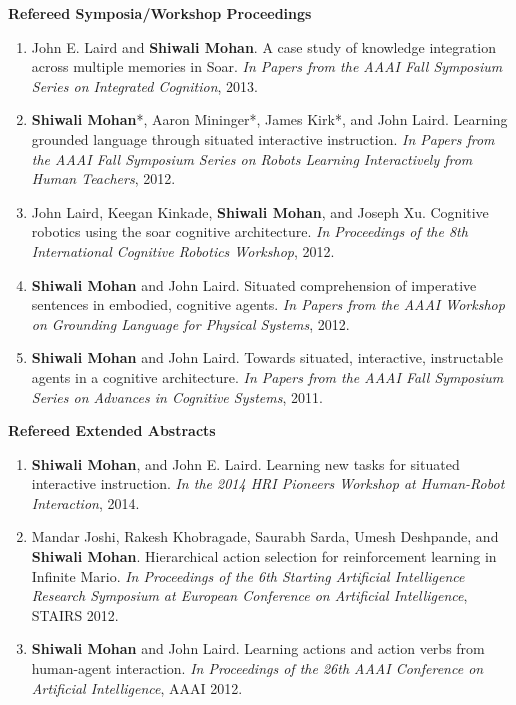 \documentclass[margin,line,11pt]{res}
\begin{document}
\begin{resume}
\textbf{Refereed Symposia/Workshop Proceedings}
\begin{enumerate}[label=\lbrack W\arabic*\rbrack:,leftmargin=*]
\item John E. Laird and \textbf{Shiwali Mohan}. A case study of knowledge integration across multiple memories in
Soar. \emph{In Papers from the AAAI Fall Symposium Series on Integrated Cognition}, 2013.
\item \textbf{Shiwali Mohan}*, Aaron Mininger*, James Kirk*, and John Laird. Learning grounded language through
situated interactive instruction. \emph{In Papers from the AAAI Fall Symposium Series on Robots Learning Interactively from Human Teachers}, 2012.
\item John Laird, Keegan Kinkade, \textbf{Shiwali Mohan}, and Joseph Xu. Cognitive robotics using the soar cognitive
architecture. \emph{In Proceedings of the 8th International Cognitive Robotics Workshop}, 2012.
\item \textbf{Shiwali Mohan} and John Laird. Situated comprehension of imperative sentences in embodied, cognitive
agents. \emph{In Papers from the AAAI Workshop on Grounding Language for Physical Systems}, 2012.
\item \textbf{Shiwali Mohan} and John Laird. Towards situated, interactive, instructable agents in a cognitive architecture. \emph{In Papers from the AAAI Fall Symposium Series on Advances in Cognitive Systems}, 2011.
\end{enumerate}


\textbf{Refereed Extended Abstracts}
\begin{enumerate}[label=\lbrack A\arabic*\rbrack,leftmargin=*]
\item \textbf{Shiwali Mohan}, and John E. Laird. Learning new tasks for situated interactive instruction. \emph{In the 2014 HRI Pioneers Workshop at Human-Robot Interaction}, 2014.

\item Mandar Joshi, Rakesh Khobragade, Saurabh Sarda, Umesh Deshpande, and \textbf{Shiwali Mohan}. Hierarchical
action selection for reinforcement learning in Infinite Mario. \emph{In Proceedings of the 6th Starting Artificial
Intelligence Research Symposium at European Conference on Artificial Intelligence}, STAIRS 2012.

\item \textbf{Shiwali Mohan} and John Laird. Learning actions and action verbs from human-agent interaction. \emph{In
Proceedings of the 26th AAAI Conference on Artificial Intelligence}, AAAI 2012.


\end{enumerate}
\end{resume}
\end{document}
